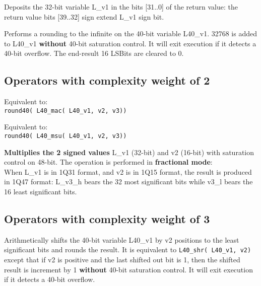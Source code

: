 Deposits the 32-bit variable L\_v1 in the bits [31..0] of the
return value: the return value bits [39..32] sign extend L\_v1
sign bit.


Performs a rounding to the infinite on the 40-bit variable
L40\_v1. 32768 is added to L40\_v1 \textbf{without} 40-bit saturation
control. It will exit execution if it detects a 40-bit overflow.  The
end-result 16 LSBits are cleared to 0.


\subsection{Operators with complexity weight of 2}


Equivalent to: \\
{\tt round40( L40\_mac( L40\_v1, v2, v3)) }


Equivalent to: \\
{\tt round40( L40\_msu( L40\_v1, v2, v3)) }


\textbf{Multiplies the 2 signed values} L\_v1 (32-bit) and v2 (16-bit)
with saturation control on 48-bit. The operation is performed in
\textbf{fractional mode}: \\ 
When L\_v1 is in 1Q31 format, and v2 is in 1Q15 format, the result is
produced in 1Q47 format: L\_v3\_h bears the 32 most significant bits
while v3\_l bears the 16 least significant bits.

\subsection{Operators with complexity weight of 3}


Arithmetically shifts the 40-bit variable L40\_v1 by v2 positions to
the least significant bits and rounds the result. It is equivalent to
{\tt L40\_shr( L40\_v1, v2)} except that if v2 is positive and the last
shifted out bit is 1, then the shifted result is increment by 1
\textbf{without} 40-bit saturation control. It will exit execution if
it detects a 40-bit overflow.

